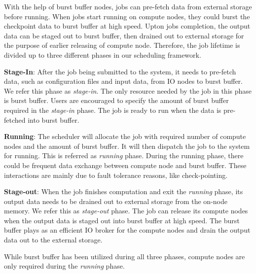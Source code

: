 
With the help of burst buffer nodes,
jobs can pre-fetch data from external storage before running.
When jobs start running on compute nodes,
they could burst the checkpoint data to burst buffer at high speed.
Upton jobs completion, the output data can be staged out to burst buffer,
then drained out to external storage for the purpose of earlier releasing of compute node.
Therefore,
the job lifetime is divided up to three different phases in our scheduling framework.

\textbf{Stage-In}: After the job being submitted to the system,
         it needs to pre-fetch data, such as configuration files and input data,
         from IO nodes to burst buffer. We refer this phase as \textit{stage-in}.
         The only resource needed by the job in this phase is burst buffer.
         Users are encouraged to specify the amount of burst buffer required in the \textit{stage-in} phase.
         The job is ready to run when the data is pre-fetched into burst buffer.
 
\textbf{Running}: The scheduler will allocate the job with required
         number of compute nodes and the amount of burst buffer. 
         It will then dispatch the job to the system for running.
         This is referred as \textit{running} phase.
         During the running phase, there could be frequent data exchange
         between compute node and burst buffer.
         These interactions are mainly due to fault tolerance reasons, like check-pointing. 
 
\textbf{Stage-out}: When the job finishes computation and
         exit the \textit{running} phase, its output data needs to be drained out
         to external storage from the on-node memory. We refer this as \textit{stage-out} phase.
         The job can release its compute nodes when the output data is staged out
         into burst buffer at high speed. The burst buffer plays as an efficient
         IO broker for the compute nodes and drain the output data out to the external storage.

While burst buffer has been utilized during all three phases,
compute nodes are only required during the \textit{running} phase. 


